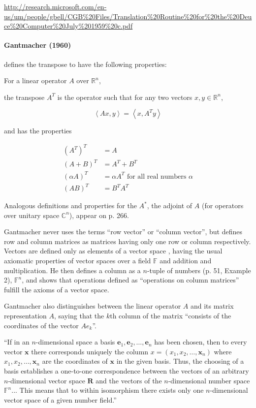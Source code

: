 \url{http://research.microsoft.com/en-us/um/people/gbell/CGB%20Files/Translation%20Routine%20for%20the%20Deuce%20Computer%20July%201959%20c.pdf}




\paragraph{Gantmacher (1960)~\cite{Gantmacher1960}}

\cite[p. 280, Definition 10]{Gantmacher1960} defines the transpose to have the following properties:

For a linear operator $A$ over $\mathbb R^n$,

the transpose $A^T$ is the operator such that for any two vectors $x, y \in \mathbb R^n$,

\[
\left\langle Ax, y \right\rangle = \left\langle x, A^T y \right\rangle
\]

and has the properties

\begin{align}
{(A^T)}^T & = A \\
{(A + B)}^T & = A^T + B^T \\
{(\alpha A)}^T & = \alpha A^T \textrm{ for all real numbers } \alpha \\
{(A B)}^T & = B^T A^T
\end{align}

Analogous definitions and properties for the $A^*$, the adjoint of $A$ (for operators over unitary space $\mathbb C^n$), appear on p. 266.

Gantmacher never uses the terms ``row vector'' or ``column vector'', but defines row and column matrices as matrices having only one row or column respectively. Vectors are defined only as elements of a vector space \cite[p. 51]{Gantmacher1960}, having the usual axiomatic properties of vector spaces over a field $\mathbb F$ and addition and multiplication. He then defines a column as a $n$-tuple of numbers (p. 51, Example 2), $\mathbb F^n$, and shows that operations defined as ``operations on column matrices'' fulfill the axioms of a vector space.

Gantmacher also distinguishes \cite[pp. 54-56]{Gantmacher1960} between the linear operator $A$ and its matrix representation $A$, saying that the $k$th column of the matrix ``consists of the coordinates of the vector $Ae_k$''.

``If in an $n$-dimensional space a basis $\mathbf e_1, \mathbf e_2, \dots, \mathbf e_n$ has been chosen, then to every vector $\mathbf x$ there corresponds uniquely the column $x = (x_1, x_2, \dots, \mathbf x_n)$ where $x_1, x_2, \dots, \mathbf x_n$ are the coordinates of $\mathbf x$ in the given basis. Thus, the choosing of a basis establishes a one-to-one correspondence between the vectors of an arbitrary $n$-dimensional vector space $\mathbf R$ and the vectors of the $n$-dimensional number space $\mathbb F^n$... This means that to within isomorphism there exists only one $n$-dimensional vector space of a given number field.''

